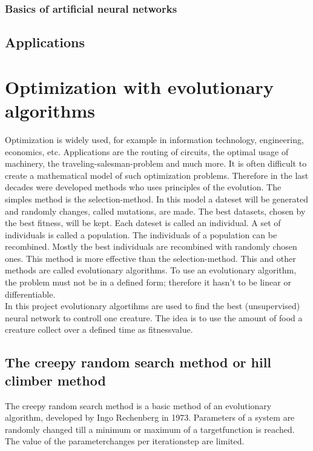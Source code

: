 \documentclass[10pt,a4paper,DIV=11]{scrreprt}
\begin{document}
\subsection{Basics of artificial neural networks}

\section{Applications}

\chapter{Optimization with evolutionary algorithms}
Optimization is widely used, for example in information technology, engineering,
economics, etc. Applications are the routing of circuits, the optimal usage of machinery,
the traveling-salesman-problem and much more. It is often difficult to create a mathematical
model of such optimization problems. Therefore in the last decades were developed methods who
uses principles of the evolution.
The simples method is the selection-method. In this model a dateset will be generated and randomly
changes, called mutations, are made. The best datasets, chosen by the best fitness, will be kept.
Each dateset is called an individual. A set of individuals is called a population. The individuals
of a population can be recombined. Mostly the best individuals are recombined with randomly chosen
ones. This method is more effective than the selection-method. This and other methods are  called
evolutionary algorithms. To use an evolutionary algorithm, the problem must not be in a defined form;
therefore it hasn't to be linear or differentiable. \\

In this project evolutionary algortihms are used to find the best 
(unsupervised) neural network to controll one creature. The idea is to use the amount of food a creature collect over a defined time as fitnessvalue.

\section{The creepy random search method or hill climber method}
The creepy random search method is a basic method of an evolutionary algorithm, developed by Ingo Rechenberg in 1973. %
Parameters of a system are randomly changed till a minimum or maximum of a targetfunction is reached. The value of the parameterchanges per iterationstep are limited. \\
\end{document}
